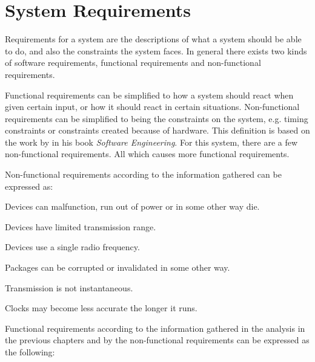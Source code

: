 \section{System Requirements}\label{requirements}
Requirements for a system are the descriptions of what a system should be able to do, and also the constraints the system faces.
In general there exists two kinds of software requirements, functional requirements and non-functional requirements. 

Functional requirements can be simplified to how a system should react when given certain input, or how it should react in certain situations.
Non-functional requirements can be simplified to being the constraints on the system, e.g. timing constraints or constraints created because of hardware.
This definition is based on the work by \citet[see][chapter 4]{SEBook} in his book \textit{Software Engineering}.
For this system, there are a few non-functional requirements. All which causes more functional requirements.

\bigskip \noindent
Non-functional requirements according to the information gathered can be expressed as:
\begin{enumberate}
    \item Devices can malfunction, run out of power or in some other way die.
    \item Devices have limited transmission range.
    \item Devices use a single radio frequency.
    \item Packages can be corrupted or invalidated in some other way.
    \item Transmission is not instantaneous.
    \item Clocks may become less accurate the longer it runs.
\end{enumberate}

\noindent
Functional requirements according to the information gathered in the analysis in the previous chapters and by the non-functional requirements can be expressed as the following: 

